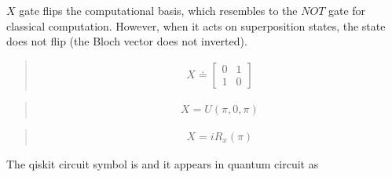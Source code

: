 \documentclass[letterpaper,10pt,english]{jupyterBook}
\begin{document}
\sphinxAtStartPar
\(X\) gate flips the computational basis, which resembles to the \(NOT\) gate for classical computation.   However, when it acts on superposition states, the state does not flip (the Bloch vector does not inverted).

\sphinxAtStartPar
{}
\begin{quote}
\begin{equation}\label{equation:q1gates/x:XGate-matrix}
\begin{split}
X \doteq \begin{bmatrix} 0 & 1 \\ 1 & 0 \end{bmatrix}
\end{split}
\end{equation}\end{quote}

\sphinxAtStartPar
{}
\begin{quote}
\begin{equation}\label{equation:q1gates/x:XGate-U}
\begin{split}
X = U(\pi,0,\pi)
\end{split}
\end{equation}\end{quote}

\sphinxAtStartPar
{}
\begin{quote}
\begin{equation*}
\begin{split}
X = i R_x(\pi)
\end{split}
\end{equation*}\end{quote}

\sphinxAtStartPar
The qiskit circuit symbol is  and it appears in quantum circuit as
\end{document}
